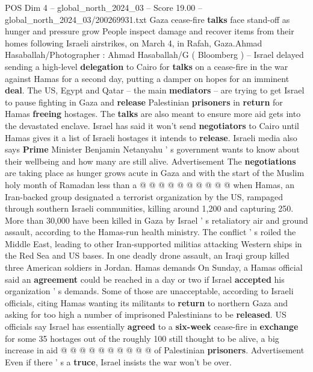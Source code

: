 \begin{textsample}{POS Dim 4 – global\_north\_2024\_03 – Score 19.00 – global\_north\_2024\_03/200269931.txt}  \label{ex:f4_pos_237}
Gaza cease-fire \textbf{talks} face stand-off as hunger and pressure grow People inspect damage and recover items from their homes following Israeli airstrikes, on March 4, in Rafah, Gaza.Ahmad Hasaballah/Photographer : Ahmad Hasaballah/G ( Bloomberg ) -- Israel delayed sending a high-level \textbf{delegation} to Cairo for \textbf{talks} on a cease-fire in the war against Hamas for a second day, putting a damper on hopes for an imminent \textbf{deal}.
The US, Egypt and Qatar -- the main \textbf{mediators} -- are trying to get Israel to pause fighting in Gaza and \textbf{release} Palestinian \textbf{prisoners} in \textbf{return} for Hamas \textbf{freeing} hostages.
The \textbf{talks} are also meant to ensure more aid gets into the devastated enclave.
Israel has said it won't send \textbf{negotiators} to Cairo until Hamas gives it a list of Israeli hostages it intends to \textbf{release}.
Israeli media also says \textbf{Prime} Minister Benjamin Netanyahu ' s government wants to know about their wellbeing and how many are still alive.
Advertisement The \textbf{negotiations} are taking place as hunger grows acute in Gaza and with the start of the Muslim holy month of Ramadan less than a @ @ @ @ @ @ @ @ @ @ when Hamas, an Iran-backed group designated a terrorist organization by the US, rampaged through southern Israeli communities, killing around 1,200 and capturing 250.
More than 30,000 have been killed in Gaza by Israel ' s retaliatory air and ground assault, according to the Hamas-run health ministry.
The conflict ' s roiled the Middle East, leading to other Iran-supported militias attacking Western ships in the Red Sea and US bases.
In one deadly drone assault, an Iraqi group killed three American soldiers in Jordan.
Hamas demands On Sunday, a Hamas official said an \textbf{agreement} could be reached in a day or two if Israel \textbf{accepted} his organization ' s demands.
Some of those are unacceptable, according to Israeli officials, citing Hamas wanting its militants to \textbf{return} to northern Gaza and asking for too high a number of imprisoned Palestinians to be \textbf{released}.
US officials say Israel has essentially \textbf{agreed} to a \textbf{six-week} cease-fire in \textbf{exchange} for some 35 hostages out of the roughly 100 still thought to be alive, a big increase in aid @ @ @ @ @ @ @ @ @ @ of Palestinian \textbf{prisoners}.
Advertisement Even if there ' s a \textbf{truce}, Israel insists the war won't be over.

\end{textsample}
